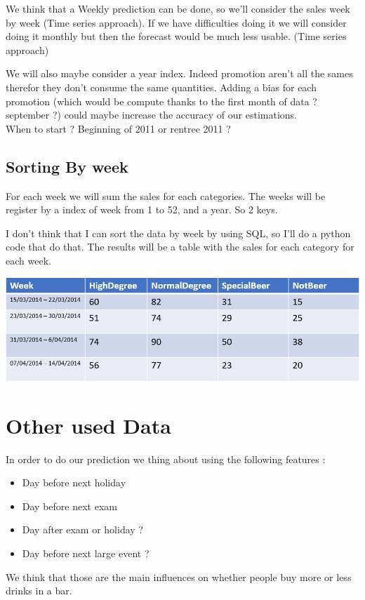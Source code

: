 \documentclass{report}
\begin{document}
We think that a Weekly prediction can be done, so we'll consider the sales week by week (Time series approach). If we have difficulties doing it we will consider doing it monthly but then the forecast would be much less usable. (Time series approach)

We will also maybe consider a year index. Indeed promotion aren't all the sames therefor they don't consume the same quantities. Adding a bias for each promotion (which would be compute thanks to the first month of data ? september ?) could maybe increase the accuracy of our estimations.\\
When to start ? Beginning of 2011 or rentree 2011 ?

\subsection{Sorting By week}

For each week we will sum the sales for each categories. The weeks will be register by a index of week from 1 to 52, and a year. So 2 keys. 

I don't think that I can sort the data by week by using SQL, so I'll do a python code that do that. The results will be a table with the sales for each category for each week.


\includegraphics[scale = 0.8]{FormatTable}

\section{Other used Data}

In order to do our prediction we thing about using the following features :
\begin{itemize}
\item Day before next holiday 
\item Day before next exam
\item Day after exam or holiday ?
\item Day before next large event ?
\end{itemize}

We think that those are the main influences on whether people buy more or less drinks in a bar.
\end{document}
